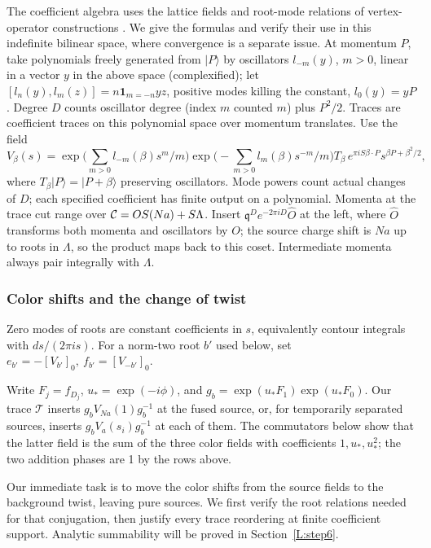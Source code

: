 \documentclass[11pt]{article}
\numberwithin{equation}{section}
\theoremstyle{definition}\newtheorem{definition}[theorem]{Definition}
\theoremstyle{remark}\newtheorem{remark}[theorem]{Remark}
\begin{document}
The coefficient algebra uses the lattice fields and root-mode relations of vertex-operator constructions \cite[Section~2.1, equations~(2.2)--(2.5)]{Frenkel1985}. We give the formulas and verify their use in this indefinite bilinear space, where convergence is a separate issue. At momentum \(P\), take polynomials freely generated from \(|P\rangle\) by oscillators \(l_{-m}(y)\), \(m>0\), linear in a vector \(y\) in the above space (complexified); let
\([l_n(y),l_m(z)]=n\mathbf1_{m=-n} y z\), positive modes killing the constant, \(l_0(y)=yP\). Degree \(D\) counts oscillator degree (index \(m\) counted \(m\)) plus \(P^2/2\). Traces are coefficient traces on this polynomial space over momentum translates. Use the field
\[
 V_\beta(s)=
 \exp\Big(\sum_{m>0} l_{-m}(\beta)s^m/m\Big)
 \exp\Big(-\sum_{m>0} l_m(\beta)s^{-m}/m\Big)
 T_\beta\, e^{\pi i S\beta\cdot P}s^{\beta P+\beta^2/2},
\]
where \(T_\beta|P\rangle=|P+\beta\rangle\) preserving oscillators. Mode powers count actual changes of \(D\); each specified coefficient has finite output on a polynomial. Momenta at the trace cut range over \({\cal C}=OS(Na)+S\Lambda\). Insert \(\mathfrak q^D e^{-2\pi iD}\widehat O\) at the left, where \(\widehat O\) transforms both momenta and oscillators by \(O\); the source charge shift is \(Na\) up to roots in \(\Lambda\), so the product maps back to this coset. Intermediate momenta always pair integrally with \(\Lambda\).

\subsubsection*{Color shifts and the change of twist}

Zero modes of roots are constant coefficients in \(s\), equivalently contour integrals with \(ds/(2\pi i s)\). For a norm-two root \(b'\) used below, set \(e_{b'}=-[V_{b'}]_0,\ f_{b'}=[V_{-b'}]_0\).

Write \(F_j=f_{D_j}\), \(u_*=\exp(-i\phi)\), and \(g_b=\exp(u_*F_1)\exp(u_*F_0)\).
Our trace \(\mathcal T\) inserts \(g_b V_{Na}(1) g_b^{-1}\) at the fused source, or, for temporarily separated sources, inserts \(g_b V_a(s_i)g_b^{-1}\) at each of them. The commutators below show that the latter field is the sum of the three color fields with coefficients \(1,u_*,u_*^2\); the two addition phases are 1 by the rows above.

Our immediate task is to move the color shifts from the source fields to
the background twist, leaving pure sources. We first verify the root
relations needed for that conjugation, then justify every trace
reordering at finite coefficient support. Analytic summability will be
proved in Section~\ref{L:step6}.
\end{document}
